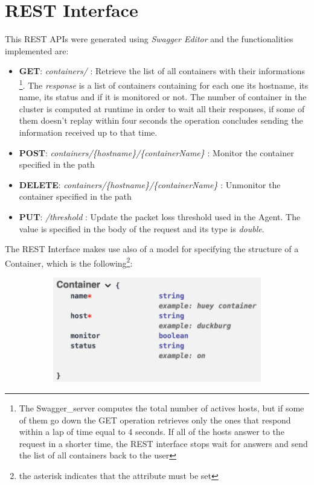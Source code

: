 \section{REST Interface}
This REST APIs were generated using \textit{Swagger Editor} and the functionalities implemented are:

\begin{itemize}
	\item \textbf{GET}:
		\subitem \textit{containers/} : Retrieve the list of all containers with their informations \footnote{The Swagger\_server computes the total number of actives hosts, but if some of them go down the GET operation retrieves only the ones that respond within a lap of time equal to 4 seconds. If all of the hosts answer to the request in a shorter time, the REST interface stops wait for answers and send the list of all containers back to the user}. The \textit{response} is a list of containers containing for each one its hostname, its name, its status and if it is monitored or not. The number of container in the cluster is computed at runtime in order to wait all their responses, if some of them doesn't replay within four seconds the operation concludes sending the information received up to that time.
	\item \textbf{POST}:
		\subitem \textit{containers/\{hostname\}/\{containerName\}} : Monitor the container specified in the path
	\item \textbf{DELETE}:
		\subitem \textit{containers/\{hostname\}/\{containerName\}} : Unmonitor the container specified in the path
	\item \textbf{PUT}:
		\subitem \textit{/threshold} : Update the packet loss threshold used in the Agent. The value is specified in the body of the request and its type is \textit{double}.
\end{itemize}

\noindent The REST Interface makes use also of a model for specifying the structure of a Container, which is the following\footnote{the asterisk indicates that the attribute must be set}:

\begin{figure}[H]
	\begin{subfigure}{\textwidth}
	\centering
		\includegraphics[width=0.9\linewidth]{img/container.png} 
	\end{subfigure}
\end{figure}